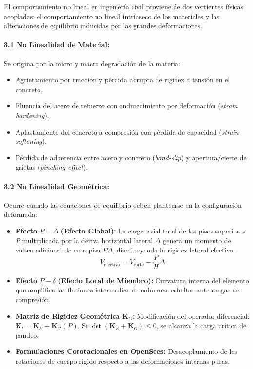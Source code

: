 \documentclass[11pt,letterpaper]{article}
\begin{document}
\begin{modulebox}
El comportamiento no lineal en ingeniería civil proviene de dos vertientes físicas acopladas: el comportamiento no lineal intrínseco de los materiales y las alteraciones de equilibrio inducidas por las grandes deformaciones.

\paragraph{3.1 No Linealidad de Material:}
Se origina por la micro y macro degradación de la materia:
\begin{itemize}
    \item Agrietamiento por tracción y pérdida abrupta de rigidez a tensión en el concreto.
    \item Fluencia del acero de refuerzo con endurecimiento por deformación (\textit{strain hardening}).
    \item Aplastamiento del concreto a compresión con pérdida de capacidad (\textit{strain softening}).
    \item Pérdida de adherencia entre acero y concreto (\textit{bond-slip}) y apertura/cierre de grietas (\textit{pinching effect}).
\end{itemize}

\paragraph{3.2 No Linealidad Geométrica:}
Ocurre cuando las ecuaciones de equilibrio deben plantearse en la configuración deformada:
\begin{itemize}
    \item \textbf{Efecto $P-\Delta$ (Efecto Global):} La carga axial total de los pisos superiores $P$ multiplicada por la deriva horizontal lateral $\Delta$ genera un momento de volteo adicional de entrepiso $P\Delta$, disminuyendo la rigidez lateral efectiva:
    \begin{equation}
        V_{\text{efectivo}} = V_{\text{corte}} - \frac{P}{H}\Delta
    \end{equation}
    \item \textbf{Efecto $P-\delta$ (Efecto Local de Miembro):} Curvatura interna del elemento que amplifica las flexiones intermedias de columnas esbeltas ante cargas de compresión.
    \item \textbf{Matriz de Rigidez Geométrica $\mathbf{K}_G$:} Modificación del operador diferencial: $\mathbf{K}_t = \mathbf{K}_E + \mathbf{K}_G(P)$. Si $\det(\mathbf{K}_E + \mathbf{K}_G) \le 0$, se alcanza la carga crítica de pandeo.
    \item \textbf{Formulaciones Corotacionales en OpenSees:} Desacoplamiento de las rotaciones de cuerpo rígido respecto a las deformaciones internas puras.
\end{itemize}


\end{modulebox}
\end{document}
